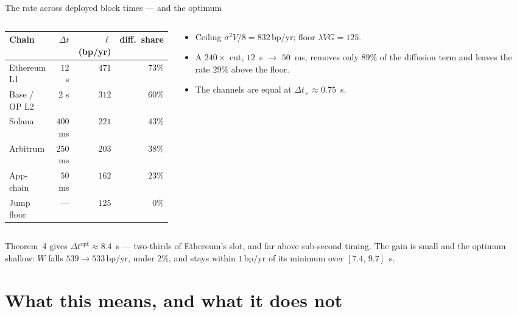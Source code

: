 \documentclass[10pt,xcolor=x11names,aspectratio=169]{beamer}
\newcommand{\dt}{\Delta t}
\newcommand{\1}{\mathbf{1}}
\newcommand{\bpyr}{\,\text{bp/yr}}
\begin{document}
\begin{frame}{The rate across deployed block times --- and the optimum}
  \begin{columns}[T]
    \begin{column}{0.50\textwidth}
      \small
      \begin{tabular}{lrrr}
        \toprule
        Chain & $\dt$ & $\ell$ (bp/yr) & diff.\ share \\
        \midrule
        Ethereum L1 & $12$ s   & $471$ & $73\%$ \\
        Base / OP L2 & $2$ s   & $312$ & $60\%$ \\
        Solana      & $400$ ms & $221$ & $43\%$ \\
        Arbitrum    & $250$ ms & $203$ & $38\%$ \\
        App-chain   & $50$ ms  & $162$ & $23\%$ \\
        \midrule
        Jump floor  & ---      & $125$ & $0\%$ \\
        \bottomrule
      \end{tabular}
    \end{column}
    \begin{column}{0.47\textwidth}
      \begin{itemize}
        \item Ceiling $\sigma^2V/8 = 832\bpyr$; floor $\lambda VG = 125$.
        \item A $240\times$ cut, $12$~s $\to$ $50$~ms, removes only $89\%$ of
              the diffusion term and leaves the rate $29\%$ above the floor.
        \item The channels are equal at $\dt_\times \approx 0.75$~s.
      \end{itemize}
    \end{column}
  \end{columns}
  \medskip

  \begin{takeaway}
    Theorem~4 gives $\dt^{\mathrm{opt}} \approx 8.4$~s --- two-thirds of Ethereum's slot,
    and far above sub-second timing. The gain is small and the optimum shallow:
    $W$ falls $539 \to 533\bpyr$, under $2\%$, and stays within $1\bpyr$ of its
    minimum over $[7.4,\,9.7]$~s.
  \end{takeaway}
\end{frame}

\section{What this means, and what it does not}
\end{document}
